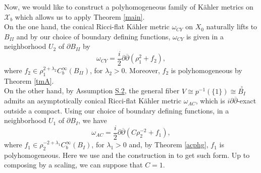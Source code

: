 \documentclass[a4paper,11pt]{article}
\begin{document}
Now, we would like to construct a polyhomogeneous family of Kähler metrics on $\mathcal{X}_b$ which allows us to apply Theorem \ref{main}.\\

On the one hand, the conical Ricci-flat Kähler metric $\omega_{CY}$ on $X_0$ naturally lifts to $B_{II}$ and by our choice of boundary defining functions, $\omega_{CY}$ is given in a neighborhood $U_2$ of $\partial B_{II}$ by 
$$
\omega_{CY} = \frac{i}{2} \partial \overline{\partial} \left( \rho_1^2 + f_2 \right),
$$
where $f_2 \in \rho_1^{2+ \lambda_2} C_b^\infty(B_{II})$, for $\lambda_2>0$. Moreover, $f_2$ is polyhomogeneous by Theorem \ref{tmA}.\\

On the other hand, by Assumption \hyperlink{S.2}{S.2}, the general fiber $V \cong p^{-1}(\{ 1\}) \cong \overset{\circ}{B_{I}}$ admits an asymptotically conical Ricci-flat Kähler metric $\omega_{AC}$, which is $i \partial \overline{\partial}$-exact outside a compact. Using our choice of boundary defining functions, in a neighborhood $U_1$ of $\partial B_I$, we have 
$$
\omega_{AC} = \frac{i}{2} \partial \overline{\partial} \left( C\rho_2^{-2} + f_1 \right),
$$
where $f_1 \in \rho_2^{-2+ \lambda_1} C_b^\infty(B_{I})$, for $\lambda_1>0$ and, by Theorem \ref{acphg}, $f_1$ is polyhomogeneous. Here we use \cite[Lemma 2.15]{conlon2013asymptotically} and the construction in \cite[Proof of Theorem 2.4]{conlon2013asymptotically} to get such form. Up to composing by a scaling, we can suppose that $C=1$.\\
\end{document}
